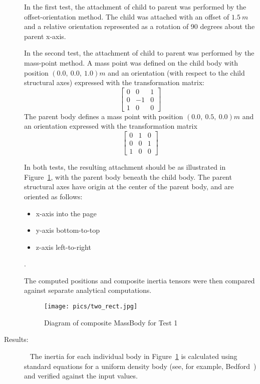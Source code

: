 \begin{description}
In the first test, the attachment of child to parent was performed by the
offset-orientation method.
The child was attached with an offset of $1.5 ~m$ and a
relative orientation represented as a rotation of 90 degrees about the parent
x-axis.

In the second test, the attachment of child to parent was performed by the
mass-point method. A mass point was defined on the child body with position
$(0.0, ~0.0,~1.0) m$
and an orientation (with respect to the child structural axes) expressed with
the transformation matrix:
\begin{equation*}
\begin{bmatrix} 0 & 0 & 1 \\ 0 & -1 & 0 \\ 1 & 0 & 0 \end{bmatrix}
\end{equation*}
The parent body defines a mass point with position  $(0.0, ~0.5, ~0.0) m$ and
an orientation expressed with the transformation matrix
\begin{equation*}
 \begin{bmatrix} 0 & 1
& 0 \\ 0 & 0 & 1 \\ 1 & 0 & 0 \end{bmatrix}
\end{equation*}

In both tests, the resulting attachment should be as illustrated in
Figure~\ref{two_rect}, with the parent body beneath the child body.
The parent structural axes have origin at the center of the parent body, and
are oriented as follows:
\begin{itemize}
 \item x-axis into the page
 \item y-axis bottom-to-top
 \item z-axis left-to-right
\end{itemize}
.

The computed positions and composite inertia tensors were then compared
against separate analytical computations.

\begin{figure}[h]
\begin{center}
\texttt{[image: pics/two\_rect.jpg]}
\caption{Diagram of composite MassBody for Test 1}
\label{two_rect}
\end{center}
\end{figure}


\item[Results:]\ \newline
The inertia for each individual body in Figure~\ref{two_rect} is calculated
using standard equations for a uniform density body (see,
for example, Bedford~\cite{Bedford}) and verified against the input values.


\end{description}
